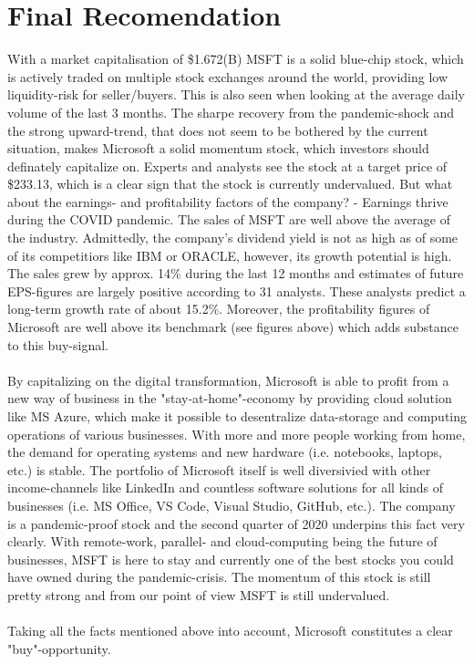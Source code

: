 \documentclass[]{article}
\begin{document}
	\section{Final Recomendation}
	With a market capitalisation of \$1.672(B) MSFT is a solid blue-chip stock, which is actively traded on multiple stock exchanges around the world, providing low liquidity-risk for seller/buyers. This is also seen when looking at the average daily volume of the last 3 months. The sharpe recovery from the pandemic-shock and the strong upward-trend, that does not seem to be bothered by the current situation, makes Microsoft a solid momentum stock, which investors should definately capitalize on. Experts and analysts see the stock at a target price of \$233.13, which is a clear sign that the stock is currently undervalued. But what about the earnings- and profitability factors of the company? - Earnings thrive during the COVID pandemic. The sales of MSFT are well above the average of the industry. Admittedly, the company's dividend yield is not as high as of some of its competitiors like IBM or ORACLE, however, its growth potential is high. The sales grew by approx. 14\% during the last 12 months and estimates of future EPS-figures are largely positive according to 31 analysts. These analysts predict a long-term growth rate of about 15.2\%. Moreover, the profitability figures of Microsoft  are well above its benchmark (see figures above) which adds substance to this buy-signal.\\\\
	By capitalizing on the digital transformation, Microsoft is able to profit from a new way of business in the "stay-at-home"-economy by providing cloud solution like MS Azure, which make it possible to desentralize data-storage and computing operations of various businesses. With more and more people working from home, the demand for operating systems and new hardware (i.e. notebooks, laptops, etc.) is stable. The portfolio of Microsoft itself is well diversivied with other income-channels like LinkedIn and countless software solutions for all kinds of businesses (i.e. MS Office, VS Code, Visual Studio, GitHub, etc.). The company is a pandemic-proof stock and the second quarter of 2020 underpins this fact very clearly. With remote-work, parallel- and cloud-computing being the future of businesses, MSFT is here to stay and currently one of the best stocks you could have owned during the pandemic-crisis. The momentum of this stock is still pretty strong and from our point of view MSFT is still undervalued.\\\\
	Taking all the facts mentioned above into account, Microsoft constitutes a clear "buy"-opportunity.
	
	
	
	
\end{document}
